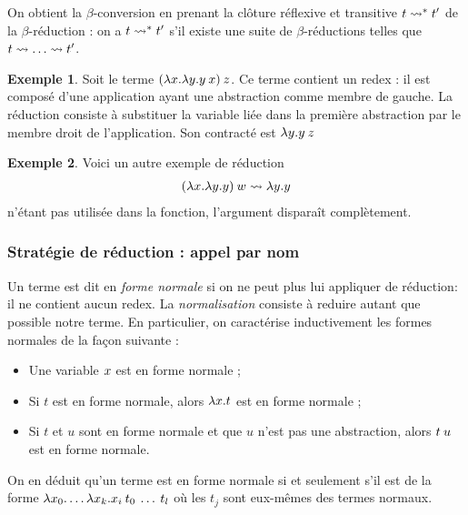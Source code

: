 \documentclass {article}
\theoremstyle{definition}
\newtheorem{example}{Exemple}
\theoremstyle{remark}
\begin{document}
On obtient la \(\beta\)-conversion en prenant la clôture réflexive et
transitive \(t \leadsto^{*} t'\) de la \(\beta\)-réduction : on a \(t \leadsto^{*}
t'\) s'il existe une suite de \(\beta\)-réductions telles que \(t \leadsto
\ldots \leadsto t'\).

\begin{example}
  Soit le terme \((\lambda x. \lambda y. y\:x)\:z\).  Ce terme
  contient un redex : il est composé d'une application ayant une
  abstraction comme membre de gauche. La réduction consiste à
  substituer la variable liée dans la première abstraction par le
  membre droit de l'application. Son contracté est
  \(\lambda y. y\:z\)
\end{example}

\begin{example}
  Voici un autre exemple de réduction
  \begin{align*}
    & (\lambda x. \lambda y. y)\:w \leadsto \lambda y. y \\
  \end{align*}
   n'étant pas utilisée dans la fonction, l'argument  disparaît complètement.
\end{example}


\subsubsection{Stratégie de réduction : appel par nom}

\label{reduction:call_by_name}
Un terme est dit en \emph{forme
  normale} si on ne peut plus lui
appliquer de réduction: il ne contient aucun redex. La \emph{normalisation}
consiste à reduire autant que possible notre terme. En
particulier, on caractérise inductivement les formes normales de la
façon suivante :
%
\begin{itemize}
\item Une variable \(x\) est en forme normale ;
\item Si \(t\) est en forme normale, alors \(\lambda x. t\) est en
  forme normale ;
\item Si \(t\) et \(u\) sont en forme normale et que \(u\) n'est pas
  une abstraction, alors \(t\:u\) est en forme normale.
\end{itemize}

On en déduit qu'un terme est en forme normale si et seulement s'il est
de la forme
\(\lambda x_0. \ldots\lambda x_k. x_i\:t_0\:\ldots\:t_l\)
où les \(t_j\) sont eux-mêmes des termes normaux.
\end{document}
